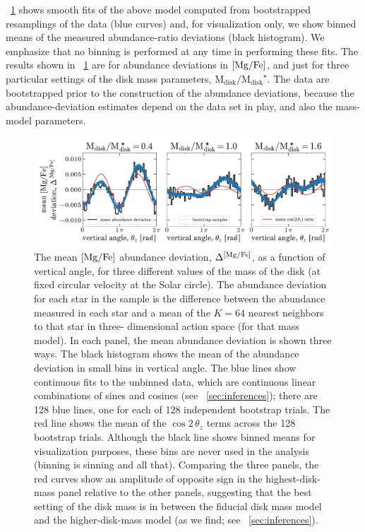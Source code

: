 \documentclass[modern]{aastex63}
\newcommand{\mdisk}{\ensuremath{\mathrm{M}_\mathrm{disk}}}
\newcommand{\mratio}{\ensuremath{\mdisk / \mdisk^\star}}
\begin{document}
\figurename~\ref{fig:sinusoid-fits} shows smooth fits of the above model
computed from bootstrapped resamplings of the data (blue curves) and, for
visualization only, we show binned means of the measured abundance-ratio
deviations (black histogram).
We emphasize that no binning is performed at any time in performing these fits.
The results shown in \figurename~\ref{fig:sinusoid-fits} are for abundance
deviations in ${[\mathrm{Mg}/\mathrm{Fe}]}$, and just for three particular settings of the disk mass
parameters, \mratio.
The data are bootstrapped prior to the construction of the abundance deviations,
because the abundance-deviation estimates depend on the data set in play, and
also the mass-model parameters.

\begin{figure}[!tp] %
  \begin{mdframed}
    \color{captiongray}
  \begin{center}
  \includegraphics[width=\textwidth]{sinusoid-fits.pdf}
  \end{center}
  \caption{%
    The mean ${[\mathrm{Mg}/\mathrm{Fe}]}$ abundance deviation, $\Delta^{{[\mathrm{Mg}/\mathrm{Fe}]}}$, as a
    function of vertical angle, for three different values of the mass of the
    disk (at fixed circular velocity at the Solar circle).
    The abundance deviation for each star in the sample is the difference
    between the abundance measured in each star and a mean of the $K=64$ nearest
    neighbors to that star in three- dimensional action space (for that mass
    model).
    In each panel, the mean abundance deviation is shown three ways.
    The black histogram shows the mean of the abundance deviation in small bins
    in vertical angle.
    The blue lines show continuous fits to the unbinned data, which are
    continuous linear combinations of sines and cosines (see
    \sectionname~\ref{sec:inferences}); there are 128 blue lines, one for each
    of 128 independent bootstrap trials.
    The red line shows the mean of the $\cos 2\,\theta_z$ terms across the
    128 bootstrap trials.
    Although the black line shows binned means for visualization purposes,
    these bins are never used in the analysis (binning is sinning and all that).
    Comparing the three panels, the red curves show an amplitude of opposite
    sign in the highest-disk-mass panel relative to the other panels, suggesting
    that the best setting of the disk mass is in between the fiducial disk mass
    model and the higher-disk-mass model (as we find; see
    \sectionname~\ref{sec:inferences}).
  \label{fig:sinusoid-fits}
  }
  \end{mdframed}
\end{figure}
\end{document}
